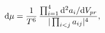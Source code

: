 \begin{equation}
{\rm d}\mu = { 1\over T^6} \, {\prod_{i=1}^4 {\rm d}^2 a_i/{\rm
d}V_{pr} \over |\prod_{i < j} a_{ij}|^4 } , \label{eq20}
\end{equation}

